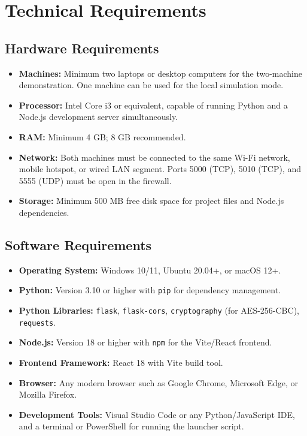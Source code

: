 \section{Technical Requirements}

\subsection{Hardware Requirements}

\begin{itemize}
    \item \textbf{Machines:} Minimum two laptops or desktop computers for the two-machine demonstration. One machine can be used for the local simulation mode.
    \item \textbf{Processor:} Intel Core i3 or equivalent, capable of running Python and a Node.js development server simultaneously.
    \item \textbf{RAM:} Minimum 4 GB; 8 GB recommended.
    \item \textbf{Network:} Both machines must be connected to the same Wi-Fi network, mobile hotspot, or wired LAN segment. Ports 5000 (TCP), 5010 (TCP), and 5555 (UDP) must be open in the firewall.
    \item \textbf{Storage:} Minimum 500 MB free disk space for project files and Node.js dependencies.
\end{itemize}

\subsection{Software Requirements}

\begin{itemize}
    \item \textbf{Operating System:} Windows 10/11, Ubuntu 20.04+, or macOS 12+.
    \item \textbf{Python:} Version 3.10 or higher with \texttt{pip} for dependency management.
    \item \textbf{Python Libraries:} \texttt{flask}, \texttt{flask-cors}, \texttt{cryptography} (for AES-256-CBC), \texttt{requests}.
    \item \textbf{Node.js:} Version 18 or higher with \texttt{npm} for the Vite/React frontend.
    \item \textbf{Frontend Framework:} React 18 with Vite build tool.
    \item \textbf{Browser:} Any modern browser such as Google Chrome, Microsoft Edge, or Mozilla Firefox.
    \item \textbf{Development Tools:} Visual Studio Code or any Python/JavaScript IDE, and a terminal or PowerShell for running the launcher script.
\end{itemize}
